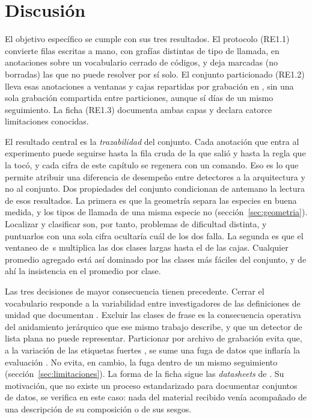 \section{Discusión}
\label{sec:discusion-oe1}

 El objetivo específico se cumple con sus tres resultados.
El protocolo (RE1.1) convierte \nRawRows{} filas escritas a mano, con
\nRawCallValues{} grafías distintas de tipo de llamada, en \nAnnotationsCleaned{}
anotaciones sobre un vocabulario cerrado de \nVocabCallValues{} códigos, y deja
marcadas (no borradas) las \nReview{} que no puede resolver por sí solo. El
conjunto particionado (RE1.2) lleva esas anotaciones a \nWindows{} ventanas y
\nBoxes{} cajas repartidas por grabación en \splitRatios{}, sin una sola
grabación compartida entre particiones, aunque sí días de un mismo seguimiento.
La ficha (RE1.3) documenta ambas capas y declara catorce limitaciones conocidas.

 El resultado central es la \emph{trazabilidad} del
conjunto. Cada anotación que entra al experimento puede seguirse hasta la fila
cruda de la que salió y hasta la regla que la tocó, y cada cifra de este capítulo
se regenera con un comando. Eso es lo que permite atribuir una diferencia de
desempeño entre detectores a la arquitectura y no al conjunto. Dos propiedades
del conjunto condicionan de antemano la lectura de esos resultados. La primera es
que la geometría separa las especies en buena medida, y los tipos de llamada de
una misma especie no (sección~\ref{sec:geometria}). Localizar y clasificar son,
por tanto, problemas de dificultad distinta, y puntuarlos con una sola cifra
ocultaría cuál de los dos falla. La segunda es que el ventaneo de \clipLen{}\,s
multiplica las dos clases largas hasta el \pctLongBoxes{} de las cajas. Cualquier
promedio agregado está así dominado por las clases más fáciles del conjunto, y de
ahí la insistencia en el promedio por clase.

 Las tres decisiones de mayor
consecuencia tienen precedente. Cerrar el vocabulario responde a la variabilidad
entre investigadores de las definiciones de unidad que documentan
\citet{kershenbaum_acoustic_2016}. Excluir las clases de frase es la consecuencia
operativa del anidamiento jerárquico que ese mismo trabajo describe, y que un
detector de lista plana no puede representar. Particionar por archivo de
grabación evita que, a la variación de las etiquetas fuertes
\citep{koga_lead_2024}, se sume una fuga de datos que inflaría la evaluación
\citep{barz_duplicates_2020}. No evita, en cambio, la fuga dentro de un mismo
seguimiento (sección~\ref{sec:limitaciones}). La forma de la ficha sigue las
\textit{datasheets} de \citet{gebru_2021}. Su motivación, que no existe un proceso
estandarizado para documentar conjuntos de datos, se verifica en este caso: nada
del material recibido venía acompañado de una descripción de su composición o de
sus sesgos.

